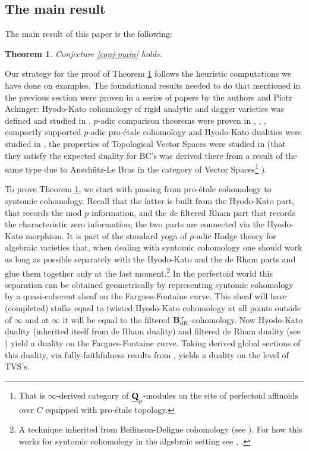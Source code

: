 \documentclass[10pt,reqno]{amsart}
\newtheorem{theorem}[equation]{Theorem}
\theoremstyle{definition}
\theoremstyle{remark}
\newcommand{\dr}{\operatorname{dR} }
\numberwithin{equation}{section}
\def\Q{{\bf Q}} \def\Z{{\bf Z}}
\numberwithin{equation}{section}
\begin{document}
 \subsection{The main result}  The main result of this paper is the following: 
 \begin{theorem} \label{main-1}Conjecture \ref{conj-main} holds.
 \end{theorem}
    Our strategy for the proof of Theorem \ref{main-1} follows the heuristic computations we have done on examples.
 The  foundational results  needed to do that mentioned in the previous section
   were proven in a series of papers by the authors and Piotr Achinger: Hyodo-Kato cohomology of rigid analytic and dagger varieties was defined  and studied in \cite{CN4}, $p$-adic comparison theorems were proven in \cite{CN4}, \cite{CN5}, \cite{SG}, compactly supported $p$-adic pro-\'etale cohomology and Hyodo-Kato dualities were studied in \cite{AGN}, the  properties of Topological Vector Spaces were studied in \cite{TVS} (that they satisfy the expected duality for BC's was derived there from a result of the same  type due to Ansch\"utz-Le Bras in the category of Vector Spaces\footnote{That is $\infty$-derived category of $\underline{\Q}_p$-modules on the site of perfectoid affinoids over $C$ equipped with pro-\'etale topology.} \cite{ALB}). 
   
    To prove Theorem \ref{main-1}, we start with passing from pro-\'etale cohomology to syntomic cohomology.
 Recall that the latter is built from the Hyodo-Kato part, that records the mod $p$ information, and the de filtered Rham part that records the characteristic zero information; the two parts are connected via the Hyodo-Kato morphism.
 It is part of the standard yoga of $p$-adic Hodge theory for algebraic varieties that, when   dealing with syntomic cohomology one should work as long as possible separately with the Hyodo-Kato and the de Rham parts and glue them together only at the last moment.\footnote{A technique inherited from Beilinson-Deligne cohomology (see \cite{Bei}). For how this works for syntomic cohomology in the algebraic setting  see \cite{Ban}, \cite{DN}.} In the perfectoid world this separation can be obtained geometrically by representing syntomic cohomology by a quasi-coherent sheaf on the Fargues-Fontaine curve.
 This sheaf will have (completed) stalks equal to twisted Hyodo-Kato cohomology at all points outside of $\infty$ and at $\infty$ it will be equal to the filtered $\B^+_{\dr}$-cohomology.
 Now Hyodo-Kato duality (inherited itself from de Rham duality) and filtered de Rham duality (see \cite{AGN})  yield a duality on the Fargues-Fontaine curve. Taking derived global sections of this duality, via fully-faithfulness results from \cite{TVS},   yields a duality on the level of {\rm TVS}'s.  
\end{document}
